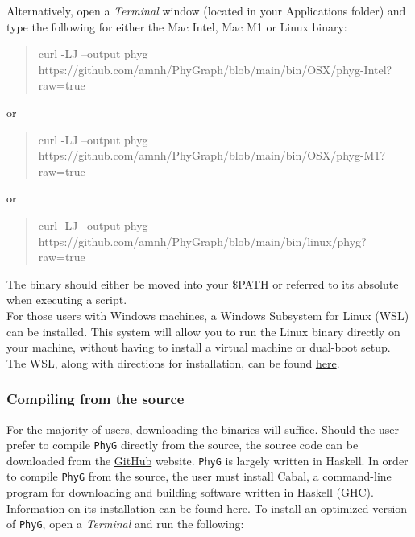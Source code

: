 \documentclass[11pt]{book}
\newcommand{\phyg}{\texttt{PhyG} }
\begin{document}
{{		Alternatively, open a \textit{Terminal} window (located in your Applications folder) and type 
		the following for either the Mac Intel, Mac M1 or Linux binary:
		
		\begin {quote}
		curl -LJ --output phyg https://github.com/amnh/PhyGraph/blob/main/bin/OSX/phyg-Intel?raw=true
		\end{quote}		
		
		\noindent or 
		
		\begin {quote}
		curl -LJ --output phyg https://github.com/amnh/PhyGraph/blob/main/bin/OSX/phyg-M1?raw=true
		\end{quote}	
		
		\noindent or 
		
		\begin {quote}
		curl -LJ --output phyg https://github.com/amnh/PhyGraph/blob/main/bin/linux/phyg?
		raw=true
		\end{quote}
		
		\noindent The binary should either be moved into your \$PATH or referred to its 
		absolute when executing a script.\\
		
		For those users with Windows machines, a Windows Subsystem for Linux 
		(WSL) can be installed. This system will allow you to run the Linux binary directly 
		on your machine, without having to install a virtual machine or dual-boot setup. 
		The WSL, along with directions for installation, can be found 
		\href{https://learn.microsoft.com/en-us/windows/wsl/}{here}.
	
	\subsubsection{Compiling from the source}
		For the majority of users, downloading the binaries will suffice. Should the user prefer to 
		compile \phyg directly from the source, the source code can be downloaded 
		from the \href{https://github.com/amnh/PhyGraph}{GitHub} website. \phyg is largely 
		written in Haskell. In order to compile \phyg from the source, the user must install Cabal, 
		a command-line program for downloading and building software written in Haskell (GHC).  
		Information on its installation can be found  
		\href{https://www.schoolofhaskell.com/user/simonmichael/how-to-cabal-install}{here}.
		To install an optimized version of \texttt{PhyG}, open a \textit{Terminal} and run the 
		following:
		
}}
\end{document}
